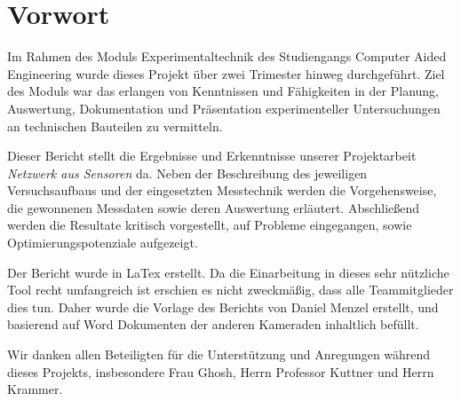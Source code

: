 
\chapter*{Vorwort}
\thispagestyle{empty} %

Im Rahmen des Moduls Experimentaltechnik des Studiengangs Computer Aided Engineering wurde dieses Projekt über zwei Trimester hinweg durchgeführt.
Ziel des Moduls war das erlangen von Kenntnissen und Fähigkeiten in der Planung, Auswertung, Dokumentation und Präsentation experimenteller Untersuchungen an technischen Bauteilen zu vermitteln.

Dieser Bericht stellt die Ergebnisse und Erkenntnisse unserer Projektarbeit \textit{Netzwerk aus Sensoren} da.
Neben der Beschreibung des jeweiligen Versuchsaufbaus und der eingesetzten Messtechnik  werden die Vorgehensweise, die gewonnenen Messdaten sowie deren Auswertung erläutert. Abschließend werden die Resultate kritisch vorgestellt, auf Probleme eingegangen, sowie Optimierungspotenziale aufgezeigt.

Der Bericht wurde in LaTex erstellt. Da die Einarbeitung in dieses sehr nützliche Tool recht umfangreich ist erschien es nicht zweckmäßig, dass alle Teammitglieder dies tun.
Daher wurde die Vorlage des Berichts von Daniel Menzel erstellt, und basierend auf Word Dokumenten der anderen Kameraden inhaltlich befüllt.

Wir danken allen Beteiligten für die Unterstützung und Anregungen während dieses Projekts, insbesondere Frau Ghosh, Herrn Professor Kuttner und Herrn Krammer.
